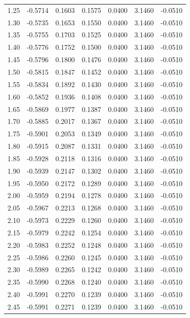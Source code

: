 \begin{longtable}{|c|c|c|c|c|c|c|}
1.25 & -0.5714 & 0.1603 & 0.1575 & 0.0400 & 3.1460 & -0.0510 \\
1.30 & -0.5735 & 0.1653 & 0.1550 & 0.0400 & 3.1460 & -0.0510 \\
1.35 & -0.5755 & 0.1703 & 0.1525 & 0.0400 & 3.1460 & -0.0510 \\
1.40 & -0.5776 & 0.1752 & 0.1500 & 0.0400 & 3.1460 & -0.0510 \\
1.45 & -0.5796 & 0.1800 & 0.1476 & 0.0400 & 3.1460 & -0.0510 \\
1.50 & -0.5815 & 0.1847 & 0.1452 & 0.0400 & 3.1460 & -0.0510 \\
1.55 & -0.5834 & 0.1892 & 0.1430 & 0.0400 & 3.1460 & -0.0510 \\
1.60 & -0.5852 & 0.1936 & 0.1408 & 0.0400 & 3.1460 & -0.0510 \\
1.65 & -0.5869 & 0.1977 & 0.1387 & 0.0400 & 3.1460 & -0.0510 \\
1.70 & -0.5885 & 0.2017 & 0.1367 & 0.0400 & 3.1460 & -0.0510 \\
1.75 & -0.5901 & 0.2053 & 0.1349 & 0.0400 & 3.1460 & -0.0510 \\
1.80 & -0.5915 & 0.2087 & 0.1331 & 0.0400 & 3.1460 & -0.0510 \\
1.85 & -0.5928 & 0.2118 & 0.1316 & 0.0400 & 3.1460 & -0.0510 \\
1.90 & -0.5939 & 0.2147 & 0.1302 & 0.0400 & 3.1460 & -0.0510 \\
1.95 & -0.5950 & 0.2172 & 0.1289 & 0.0400 & 3.1460 & -0.0510 \\
2.00 & -0.5959 & 0.2194 & 0.1278 & 0.0400 & 3.1460 & -0.0510 \\
2.05 & -0.5967 & 0.2213 & 0.1268 & 0.0400 & 3.1460 & -0.0510 \\
2.10 & -0.5973 & 0.2229 & 0.1260 & 0.0400 & 3.1460 & -0.0510 \\
2.15 & -0.5979 & 0.2242 & 0.1254 & 0.0400 & 3.1460 & -0.0510 \\
2.20 & -0.5983 & 0.2252 & 0.1248 & 0.0400 & 3.1460 & -0.0510 \\
2.25 & -0.5986 & 0.2260 & 0.1245 & 0.0400 & 3.1460 & -0.0510 \\
2.30 & -0.5989 & 0.2265 & 0.1242 & 0.0400 & 3.1460 & -0.0510 \\
2.35 & -0.5990 & 0.2268 & 0.1240 & 0.0400 & 3.1460 & -0.0510 \\
2.40 & -0.5991 & 0.2270 & 0.1239 & 0.0400 & 3.1460 & -0.0510 \\
2.45 & -0.5991 & 0.2271 & 0.1239 & 0.0400 & 3.1460 & -0.0510 \\

\end{longtable}
